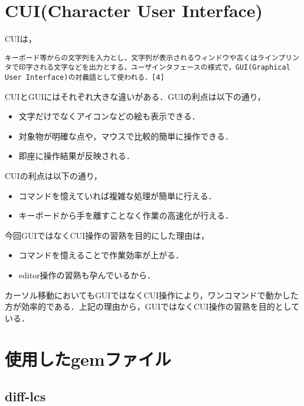    \section{CUI(Character User
Interface)}\label{cuicharacter-user-interface}

CUIは，

\begin{verbatim}
キーボード等からの文字列を入力とし，文字列が表示されるウィンドウや古くはラインプリンタで印字される文字などを出力とする，ユーザインタフェースの様式で，GUI(Graphical User Interface)の対義語として使われる．[4]
\end{verbatim}

CUIとGUIにはそれぞれ大きな違いがある．GUIの利点は以下の通り，

\begin{itemize}
\tightlist
\item
  文字だけでなくアイコンなどの絵も表示できる．
\item
  対象物が明確な点や，マウスで比較的簡単に操作できる．
\item
  即座に操作結果が反映される．
\end{itemize}

CUIの利点は以下の通り，

\begin{itemize}
\tightlist
\item
  コマンドを憶えていれば複雑な処理が簡単に行える．
\item
  キーボードから手を離すことなく作業の高速化が行える．
\end{itemize}

今回GUIではなくCUI操作の習熟を目的にした理由は，

\begin{itemize}
\tightlist
\item
  コマンドを憶えることで作業効率が上がる．
\item
  editor操作の習熟も孕んでいるから．
\end{itemize}

カーソル移動においてもGUIではなくCUI操作により，ワンコマンドで動かした方が効率的である．上記の理由から，GUIではなくCUI操作の習熟を目的としている．

    \section{使用したgemファイル}\label{ux4f7fux7528ux3057ux305fgemux30d5ux30a1ux30a4ux30eb}

    \subsection{diff-lcs}\label{diff-lcs}

